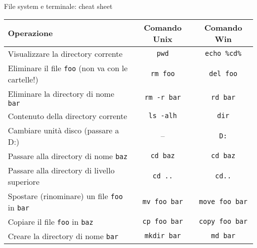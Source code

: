 \documentclass[xcolor=dvipsnames,presentation]{beamer}
\begin{document}
\begin{frame}[fragile]{File system e terminale: cheat sheet}
\label{slide:commands}
  \begin{center}
    \begin{tabular}{| l | c | c |}
      \hline
      \textbf{Operazione} & \textbf{Comando Unix} & \textbf{Comando Win} \\ \hline
      \scriptsize{}Visualizzare la directory corrente & \texttt{pwd} & \texttt{echo \%cd\%}  \\ \hline
      \scriptsize{}Eliminare il file \texttt{foo} (non va con le cartelle!) & \texttt{rm foo} & \texttt{del foo} \\ \hline
      \scriptsize{}Eliminare la directory di nome \texttt{bar} & \texttt{rm -r bar} & \texttt{rd bar} \\ \hline
      \scriptsize{}Contenuto della directory corrente & \texttt{ls -alh} & \texttt{dir} \\ \hline
      \scriptsize{}Cambiare unità disco (passare a D:) & -- & \texttt{D:} \\ \hline
      \scriptsize{}Passare alla directory di nome \texttt{baz} & \texttt{cd baz} & \texttt{cd baz} \\ \hline
      \scriptsize{}Passare alla directory di livello superiore & \texttt{cd ..} & \texttt{cd..} \\ \hline
      \scriptsize{}Spostare (rinominare) un file \texttt{foo} in \texttt{bar} & \texttt{mv foo bar} & \texttt{move foo bar} \\ \hline
      \scriptsize{}Copiare il file \texttt{foo} in \texttt{baz} & \texttt{cp foo bar} & \texttt{copy foo bar} \\ \hline
      \scriptsize{}Creare la directory di nome \texttt{bar} & \texttt{mkdir bar} & \texttt{md bar} \\ \hline
    \end{tabular}
  \end{center}
\end{frame}
\end{document}
